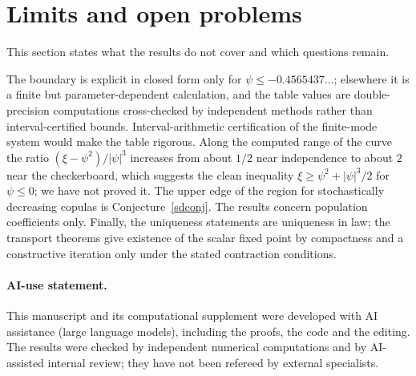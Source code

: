 \documentclass[11pt,a4paper]{article}
\theoremstyle{remark}
\newcommand{\1}{\mathbf 1}
\begin{document}
\section{Limits and open problems}\label{sec:limits}
This section states what the results do not cover and which questions remain.

The boundary is explicit in closed form only for $\psi\le-0.4565437\ldots$; elsewhere it is a finite but parameter-dependent calculation, and the table values are double-precision computations cross-checked by independent methods rather than interval-certified bounds. Interval-arithmetic certification of the finite-mode system would make the table rigorous. Along the computed range of the curve the ratio $(\xi-\psi^2)/|\psi|^3$ increases from about $1/2$ near independence to about $2$ near the checkerboard, which suggests the clean inequality $\xi\ge\psi^2+|\psi|^3/2$ for $\psi\le0$; we have not proved it. The upper edge of the region for stochastically decreasing copulas is Conjecture~\ref{sdconj}. The results concern population coefficients only. Finally, the uniqueness statements are uniqueness in law; the transport theorems give existence of the scalar fixed point by compactness and a constructive iteration only under the stated contraction conditions.

\paragraph{AI-use statement.} This manuscript and its computational supplement were developed with AI assistance (large language models), including the proofs, the code and the editing. The results were checked by independent numerical computations and by AI-assisted internal review; they have not been refereed by external specialists.
\end{document}
